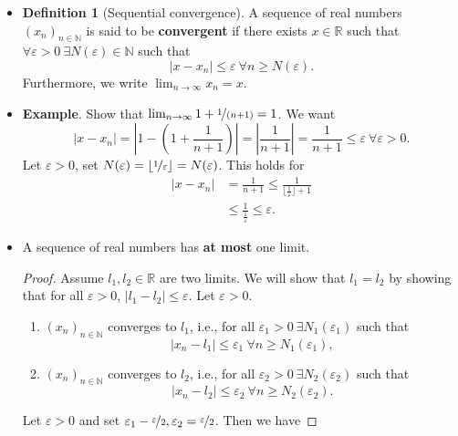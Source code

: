 \documentclass{article}
\newcommand{\R}{\mathbb{R}}
\newcommand{\N}{\mathbb{N}}
\newcommand{\seq}[2]{(#1_{#2})_{#2 \in \N}}
\newcommand{\?}{\stackrel{?}{=}}
\theoremstyle{definition} %
\newtheorem{definition}[subsection]{Definition} %
\begin{document}
\begin{itemize}
    \item[]
          \begin{definition}[Sequential convergence]
              A sequence of real numbers $\seq{x}{n}$ is said to be \textbf{convergent} if there exists $x \in \R$ such that $\forall \varepsilon > 0 \ \exists N(\varepsilon) \in \N$ such that
              $$|x - x_n| \leq \varepsilon \ \forall n \geq N(\varepsilon).$$
              Furthermore, we write $\lim_{n \to \infty} x_n = x$.
          \end{definition}
    \item \textbf{Example}. Show that $\lim_{n \to \infty} 1 + \nicefrac{1}{(n + 1)} = 1$. We want
          $$|x - x_n| = \left|1 - \left(1 + \frac{1}{n + 1}\right)\right| = \left|\frac{1}{n + 1}\right| = \frac{1}{n + 1} \leq \varepsilon \ \forall \varepsilon > 0.$$
          Let $\varepsilon > 0$, set $N(\varepsilon) = \lfloor \nicefrac{1}{\varepsilon} \rfloor = N(\varepsilon)$. This holds for
          \begin{align*}
              |x - x_n| & = \frac{1}{n + 1} \leq \frac{1}{\lfloor \frac{1}{\varepsilon} \rfloor + 1} \\
                        & \leq \frac{1}{\frac{1}{\varepsilon}} \leq \varepsilon.
          \end{align*}
    \item[]
          \begin{lemma}
              A sequence of real numbers has \textbf{at most} one limit.
          \end{lemma}
          \begin{proof}
              Assume $l_1, l_2 \in \R$ are two limits. We will show that $l_1 = l_2$ by showing that for all $\varepsilon > 0$, $|l_1 - l_2| \leq \varepsilon$. Let $\varepsilon > 0$.
              \begin{enumerate}[label=(\arabic*)]
                  \item $\seq{x}{n}$ converges to $l_1$, i.e., for all $\varepsilon_1 > 0 \ \exists N_1(\varepsilon_1)$ such that
                        $$|x_n - l_1| \leq \varepsilon_1 \ \forall n \geq N_1(\varepsilon_1),$$
                  \item $\seq{x}{n}$ converges to $l_2$, i.e., for all $\varepsilon_2 > 0 \ \exists N_2(\varepsilon_2)$ such that
                        $$|x_n - l_2| \leq \varepsilon_2 \ \forall n \geq N_2(\varepsilon_2).$$
              \end{enumerate}
              Let $\varepsilon > 0$ and set $\varepsilon_1 - \nicefrac{\varepsilon}{2}, \varepsilon_2 = \nicefrac{\varepsilon}{2}$. Then we have

\end{proof}
\end{itemize}
\end{document}
